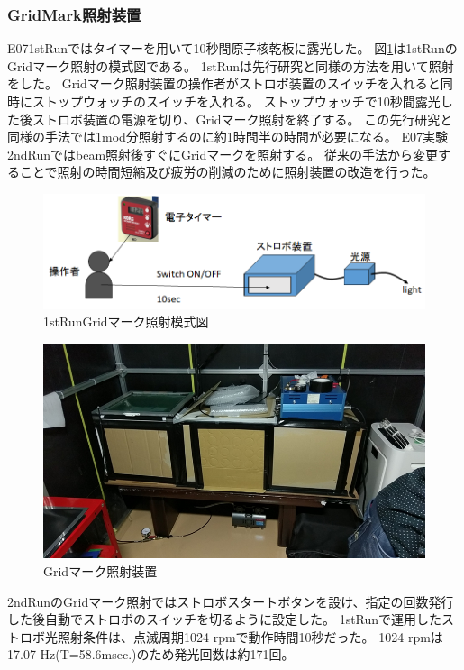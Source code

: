\documentclass[12pt,a4paper]{jarticle}
\begin{document}
\subsubsection{GridMark照射装置}
E071stRunではタイマーを用いて10秒間原子核乾板に露光した。
図\ref{fig:grid_1stRun}は1stRunのGridマーク照射の模式図である。
1stRunは先行研究と同様の方法を用いて照射をした。\cite{tamura}
Gridマーク照射装置の操作者がストロボ装置のスイッチを入れると同時にストップウォッチのスイッチを入れる。
ストップウォッチで10秒間露光した後ストロボ装置の電源を切り、Gridマーク照射を終了する。
この先行研究と同様の手法では1mod分照射するのに約1時間半の時間が必要になる。
E07実験2ndRunではbeam照射後すぐにGridマークを照射する。
従来の手法から変更することで照射の時間短縮及び疲労の削減のために照射装置の改造を行った。
\begin{figure}[htbp]
  \centering
     \includegraphics[width=120mm]{grid_1stRun.png}
  \caption{1stRunGridマーク照射模式図\label{fig:grid_1stRun}}
\end{figure}
\begin{figure}[htbp]
  \centering
     \includegraphics[width=120mm]{grid_printer.png}
  \caption{Gridマーク照射装置\label{fig:grid_masi-nn}}
\end{figure}
\newpage
\par
2ndRunのGridマーク照射ではストロボスタートボタンを設け、指定の回数発行した後自動でストロボのスイッチを切るように設定した。
1stRunで運用したストロボ光照射条件は、点滅周期1024 rpmで動作時間10秒だった。\cite{tamura}
1024 rpmは17.07 Hz(T=58.6msec.)のため発光回数は約171回。
\end{document}
